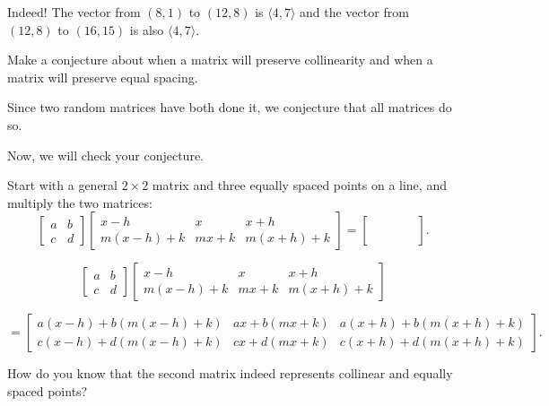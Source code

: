 \documentclass[../key.tex]{subfiles}
\begin{document}
Indeed! The vector from $(8,1)$ to $(12,8)$ is $\langle 4, 7\rangle$ and the vector from $(12,8)$ to $(16,15)$ is also $\langle 4, 7\rangle$.

\begin{inner_problem}
\item Make a conjecture about when a matrix will preserve collinearity and when a matrix will preserve equal spacing.
\end{inner_problem}

Since two random matrices have both done it, we conjecture that all matrices do so.

\begin{outer_problem}
\item Now, we will check your conjecture.
\end{outer_problem}

\begin{inner_problem}[start=1]
\item Start with a general $2\times 2$ matrix and three equally spaced points on a line, and multiply the two matrices:
$$\left[\begin{array}{cc}a & b \\ c & d\end{array}\right]
\left[\begin{array}{ccc}x-h & x & x+h \\ m(x-h)+k & mx+k & m(x+h)+k\end{array}\right]=
\left[\begin{array}{ccc}\phantom{0} & \phantom{0} & \phantom{0} \\ \phantom{0} \end{array}\right].$$
\end{inner_problem}

$$\begin{bmatrix} a & b \\ c & d \end{bmatrix} \begin{bmatrix} x-h & x & x+h \\ m(x-h)+k & mx+k & m(x+h)+k \end{bmatrix}$$

$$ = \begin{bmatrix} a(x-h) + b(m(x-h)+k) & ax + b(mx+k) & a(x+h) + b(m(x+h)+k) \\ c(x-h)+d(m(x-h)+k) & cx + d(mx+k) & c(x+h) + d(m(x+h)+k) \end{bmatrix}.$$

\begin{inner_problem}
\item How do you know that the second matrix indeed represents collinear and equally spaced points?
\end{inner_problem}
\end{document}
